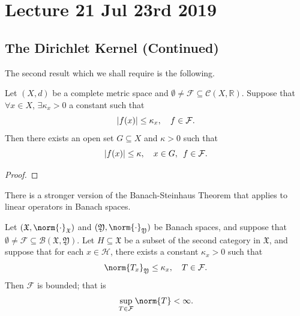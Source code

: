 \documentclass[notoc,notitlepage]{tufte-book}
\begin{document}


\chapter{Lecture 21 Jul 23rd 2019}%
\label{chp:lecture_21_jul_23rd_2019}

\section{The Dirichlet Kernel (Continued)}%
\label{sec:the_dirichlet_kernel_continued}

The second result which we shall require is the following.

\begin{thm}\label{thm:banach_steinhaus_theorem}
  Let $(X, d)$ be a complete metric space and
  $\emptyset \neq \mathcal{F} \subseteq \mathcal{C}(X, \mathbb{R})$.
  Suppose that $\forall x \in X$, $\exists \kappa_x > 0$ a constant such that
  \begin{equation*}
    \left|f(x)\right| \leq \kappa_x,\quad f \in \mathcal{F}.
  \end{equation*}
  Then there exists an open set $G \subseteq X$ and $\kappa > 0$ such that
  \begin{equation*}
    \left|f(x)\right| \leq \kappa,\quad x \in G, \enspace f \in \mathcal{F}.
  \end{equation*}
\end{thm}

\begin{proof}
\end{proof}

There is a stronger version of the Banach-Steinhaus Theorem
that applies to linear operators in Banach spaces.

\begin{thm}\label{thm:banach_steinhaus_theorem_for_operators}
  Let $(\mathfrak{X}, \norm{\cdot}_{\mathfrak{X}})$ and
  $(\mathfrak{Y}, \norm{\cdot}_{\mathfrak{Y}})$ be Banach spaces, and suppose that
  $\emptyset \neq \mathcal{F} \subseteq \mathcal{B}(\mathfrak{X}, \mathfrak{Y})$.
  Let $H \subseteq \mathfrak{X}$ be a subset of the second category in $\mathfrak{X}$,
  and suppose that for each $x \in \mathcal{H}$,
  there exists a constant $\kappa_x > 0$ such that
  \begin{equation*}
    \norm{T_x}_{\mathfrak{Y}} \leq \kappa_x, \quad T \in \mathcal{F}.
  \end{equation*}
  Then $\mathcal{F}$ is bounded; that is
  \begin{equation*}
    \sup_{T \in \mathcal{F}} \norm{T} < \infty.
  \end{equation*}
\end{thm}
\end{document}
